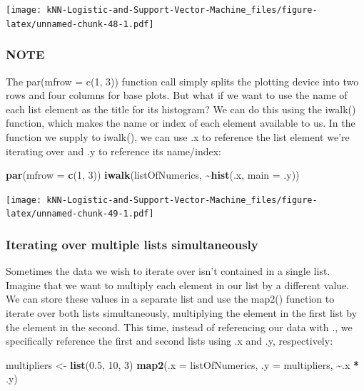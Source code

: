 \documentclass[
]{article}
\newenvironment{Shaded}{\begin{snugshade}}{\end{snugshade}}
\newcommand{\AttributeTok}[1]{\textcolor[rgb]{0.13,0.29,0.53}{#1}}
\newcommand{\DecValTok}[1]{\textcolor[rgb]{0.00,0.00,0.81}{#1}}
\newcommand{\FloatTok}[1]{\textcolor[rgb]{0.00,0.00,0.81}{#1}}
\newcommand{\FunctionTok}[1]{\textcolor[rgb]{0.13,0.29,0.53}{\textbf{#1}}}
\newcommand{\NormalTok}[1]{#1}
\newcommand{\OtherTok}[1]{\textcolor[rgb]{0.56,0.35,0.01}{#1}}
\newcommand{\SpecialCharTok}[1]{\textcolor[rgb]{0.81,0.36,0.00}{\textbf{#1}}}
\begin{document}
\texttt{[image: kNN-Logistic-and-Support-Vector-Machine\_files/figure-latex/unnamed-chunk-48-1.pdf]}

\subsubsection{NOTE}\label{note-2}

The par(mfrow = c(1, 3)) function call simply splits the plotting device
into two rows and four columns for base plots. But what if we want to
use the name of each list element as the title for its histogram? We can
do this using the iwalk() function, which makes the name or index of
each element available to us. In the function we supply to iwalk(), we
can use .x to reference the list element we're iterating over and .y to
reference its name/index:

\begin{Shaded}
\begin{Highlighting}[]
\FunctionTok{par}\NormalTok{(}\AttributeTok{mfrow =} \FunctionTok{c}\NormalTok{(}\DecValTok{1}\NormalTok{, }\DecValTok{3}\NormalTok{))}
\FunctionTok{iwalk}\NormalTok{(listOfNumerics, }\SpecialCharTok{\textasciitilde{}}\FunctionTok{hist}\NormalTok{(.x, }\AttributeTok{main =}\NormalTok{ .y))}
\end{Highlighting}
\end{Shaded}

\texttt{[image: kNN-Logistic-and-Support-Vector-Machine\_files/figure-latex/unnamed-chunk-49-1.pdf]}

\subsubsection{Iterating over multiple lists
simultaneously}\label{iterating-over-multiple-lists-simultaneously}

Sometimes the data we wish to iterate over isn't contained in a single
list. Imagine that we want to multiply each element in our list by a
different value. We can store these values in a separate list and use
the map2() function to iterate over both lists simultaneously,
multiplying the element in the first list by the element in the second.
This time, instead of referencing our data with ., we specifically
reference the first and second lists using .x and .y, respectively:

\begin{Shaded}
\begin{Highlighting}[]
\NormalTok{multipliers }\OtherTok{\textless{}{-}} \FunctionTok{list}\NormalTok{(}\FloatTok{0.5}\NormalTok{, }\DecValTok{10}\NormalTok{, }\DecValTok{3}\NormalTok{)}
\FunctionTok{map2}\NormalTok{(}\AttributeTok{.x =}\NormalTok{ listOfNumerics, }\AttributeTok{.y =}\NormalTok{ multipliers, }\SpecialCharTok{\textasciitilde{}}\NormalTok{.x }\SpecialCharTok{*}\NormalTok{ .y)}
\end{Highlighting}
\end{Shaded}
\end{document}
